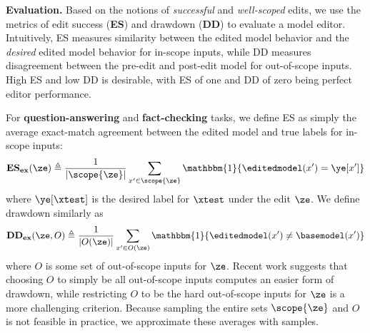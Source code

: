 \textbf{Evaluation.} Based on the notions of \textit{successful} and \textit{well-scoped} edits, we use the metrics of edit success (\textbf{ES}) and drawdown (\textbf{DD}) to evaluate a model editor.
Intuitively, ES measures similarity between the edited model behavior and the \textit{desired} edited model behavior for in-scope inputs, while DD measures disagreement between the pre-edit and post-edit model for out-of-scope inputs. High ES and low DD is desirable, with ES of one and DD of zero being perfect editor performance.

For \textbf{question-answering} and \textbf{fact-checking} tasks, we define ES as simply the average exact-match agreement between the edited model and true labels for in-scope inputs:
\begin{equation}
    \mathbf{ES_{ex}}(\ze) \triangleq \frac{1}{|\scope{\ze}|}\sum_{x' \in \scope{\ze}} \mathbbm{1}\{\editedmodel(x') = \ye[x']\}
\end{equation}
where $\ye[\xtest]$ is the desired label for $\xtest$ under the edit $\ze$.
We define drawdown similarly as
\begin{equation}
    \mathbf{DD_{ex}}(\ze,O) \triangleq \frac{1}{|O(\ze)|}\sum_{x' \in O(\ze)} \mathbbm{1}\{\editedmodel(x') \neq \basemodel(x')\}
\end{equation}
where $O$ is some set of out-of-scope inputs for $\ze$. Recent work
suggests that choosing $O$ to simply be all out-of-scope inputs computes an easier form of drawdown, while restricting $O$ to be the hard out-of-scope inputs for $\ze$ is a more challenging criterion. 
Because sampling the entire sets $\scope{\ze}$ and $O$ is not feasible in practice, we approximate these averages with samples.

